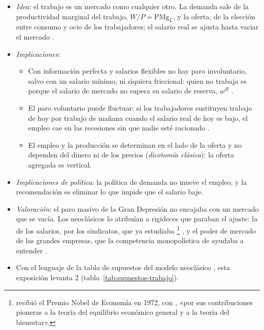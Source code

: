 \documentclass[11pt]{article}
\begin{document}
\begin{itemize}
\item \emph{Idea}: el trabajo es un mercado como cualquier otro. La demanda sale de la productividad marginal del trabajo, $W/P=\mathrm{PMg}_L$, y la oferta, de la elección entre consumo y ocio de los trabajadores; el salario real se ajusta hasta vaciar el mercado .
\item \emph{Implicaciones}:
  \begin{itemize}
  \item Con información perfecta y salarios flexibles no hay paro involuntario, salvo con un salario mínimo, ni siquiera friccional: quien no trabaja es porque el salario de mercado no supera su salario de reserva, $w^R$ .
  \item El paro voluntario puede fluctuar: si los trabajadores sustituyen trabajo de hoy por trabajo de mañana cuando el salario real de hoy es bajo, el empleo cae en las recesiones sin que nadie esté racionado\nocite{LucasRapping1969Real} .
  \item El empleo y la producción se determinan en el lado de la oferta y no dependen del dinero ni de los precios (\emph{dicotomía clásica}): la oferta agregada es vertical.
  \end{itemize}
\item \emph{Implicaciones de política}: la política de demanda no mueve el empleo, y la recomendación es eliminar lo que impide que el salario baje.
\item \emph{Valoración}: el paro masivo de la Gran Depresión no encajaba con un mercado que se vacía. Los neoclásicos lo atribuían a rigideces que paraban el ajuste: la de los salarios, por los sindicatos, que ya estudiaba \textcite{Hicks1932Theory}\footnote{ recibió el Premio Nobel de Economía en 1972, con , «por sus contribuciones pioneras a la teoría del equilibrio económico general y a la teoría del bienestar»\nocite{Nobel1972HicksArrow}.} , y el poder de mercado de las grandes empresas, que la competencia monopolística de \textcite{Chamberlin1933Theory} ayudaba a entender .
\item Con el lenguaje de la tabla de supuestos del modelo neoclásico , esta exposición levanta 2 (tabla~\ref{tab:supuestos-trabajo}).
\end{itemize}
\end{document}
